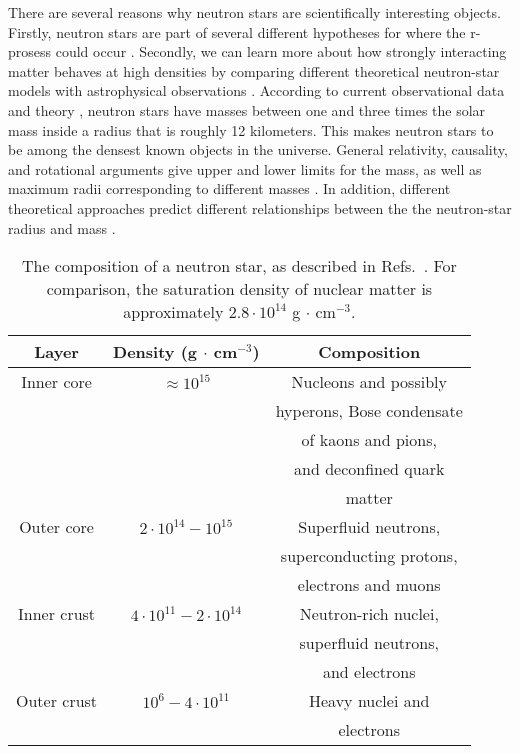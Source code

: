 \documentclass[a4paper,12pt]{report}
\begin{document}
There are several reasons why neutron stars are
scientifically interesting objects.
Firstly, neutron stars are part of several different
hypotheses for where the r-prosess could occur 
\cite{arnould_2007,goriely_2012}. Secondly, we can learn 
more about how strongly interacting matter behaves at high 
densities by comparing different 
theoretical neutron-star models with astrophysical 
observations \cite{lattimer2004}. According to current
observational data and theory \cite{lattimer2012}, neutron stars 
have masses between one and three times the solar mass 
inside a radius that is roughly 12 kilometers. This makes 
neutron stars to be among the densest known objects in the 
universe. General relativity, causality, and rotational 
arguments give upper and lower limits for the mass, as 
well as maximum radii corresponding to different masses 
\cite{lattimer2004}. In addition, different theoretical
approaches predict different relationships between the 
the neutron-star radius and mass 
\cite{heiselberg,lattimer2001,lattimer2004}. 


\begin{table}
  \begin{center}
    
    \begin{tabular}{c|c|c}
      \hline 
      \hline
      Layer & Density (g $\cdot $ cm$^{-3}$) & Composition \\
      \hline
      Inner core & $\approx 10^{15} $ & Nucleons and possibly \\
      && hyperons, Bose condensate \\
      && of kaons and pions, \\
      && and deconfined quark \\
      && matter \\
      \hline
      Outer core & $2 \cdot 10^{14} - 10^{15}$ & Superfluid neutrons, \\
      && superconducting protons, \\
      && electrons and muons \\
      \hline
      Inner crust & $4 \cdot 10^{11} - 2 \cdot 10^{14}$ & Neutron-rich nuclei, \\
      && superfluid neutrons, \\
      && and electrons \\
      \hline 
      Outer crust & $10^{6} - 4 \cdot 10^{11}$ & Heavy nuclei and \\
      && electrons \\
      \hline
      \hline
    \end{tabular}
  \end{center}
  \caption{The composition of a neutron star, as described in 
    Refs.~\cite{heiselberg,lattimer2004}. For comparison, the 
    saturation density of nuclear matter is approximately 
    $2.8 \cdot 10^{14}$ g $\cdot $ cm$^{-3}$.}
  \label{tab:comp_neutron_star}
\end{table}
\end{document}
